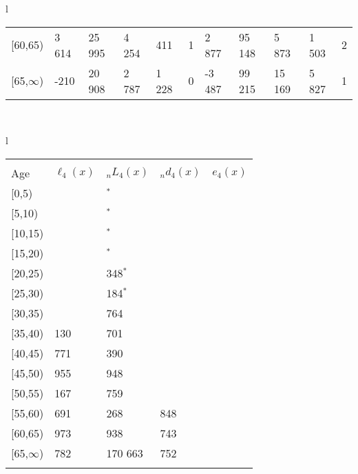 \documentclass[
]{article}
\begin{document}
\begin{table}
\begin{tabular}[t]{l}
\begin{tabular}
{}[60,65) & 3 614 & 25 995 & 4 254 & 411 & 1 & 2 877 & 95 148 & 5 873 & 1 503 & 2\\
{}[65,$\infty$) & -210 & 20 908 & 2 787 & 1 228 & 0 & -3 487 & 99 215 & 15 169 & 5 827 & 1\\
\end{tabular}\\
\end{tabular}
\centering
\begin{tabular}[t]{l}
\hline
\begin{tabular}{>{\raggedright\arraybackslash}p{.43in}>{\raggedleft\arraybackslash}p{1.3in}>{\raggedleft\arraybackslash}p{1.3in}>{\raggedleft\arraybackslash}p{1.3in}>{\raggedleft\arraybackslash}p{1.3in}}
\toprule
\multicolumn{1}{c}{ } & \multicolumn{4}{c}{(4) Lost both} \\
\cmidrule(l{3pt}r{3pt}){2-5}
Age & $\ell_{4}(x)$ & ${}_nL_{4}(x)$ & ${}_nd_{4}(x)$ & $e_{4}(x)$\\
\midrule
{}[0,5) & 0 & 0$^{*}$ & 0 & 18\\
{}[5,10) & 0 & 656$^{*}$ & 0 & 18\\
{}[10,15) & 0 & 604$^{*}$ & 0 & 18\\
{}[15,20) & 192 & 248$^{*}$ & 0 & 18\\
{}[20,25) & 192 & 1 348$^{*}$ & 2 & 18\\
\addlinespace
{}[25,30) & 190 & 1 184$^{*}$ & 2 & 18\\
{}[30,35) & 504 & 7 764 & 19 & 18\\
{}[35,40) & 1 130 & 10 701 & 31 & 18\\
{}[40,45) & 2 771 & 16 390 & 59 & 18\\
{}[45,50) & 3 955 & 49 948 & 243 & 19\\
\addlinespace
{}[50,55) & 10 167 & 94 759 & 674 & 18\\
{}[55,60) & 19 691 & 171 268 & 1 848 & 18\\
{}[60,65) & 26 973 & 236 938 & 3 743 & 17\\
{}[65,$\infty$) & 33 782 & 1 170 663 & 68 752 & 15\\
\bottomrule
\multicolumn{5}{l}{\rule{0pt}{1em}\textsuperscript{*} Based on an estimated from SIPP with less than 10 respondents in the numerator.}\\
\end{tabular}\\
\end{tabular}
\end{table}
\end{document}
